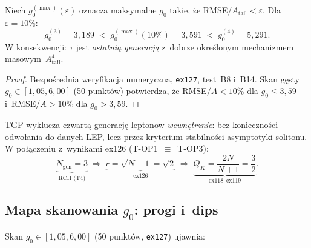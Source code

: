 \begin{theorem}%
\label{thm:T4-rch}
Niech $g_0^{(\max)}(\varepsilon)$ oznacza maksymalne $g_0$ takie, \.ze
RMSE$/A_{\mathrm{tail}} < \varepsilon$.  Dla $\varepsilon = 10\%$:
\[
  g_0^{(3)} = 3{,}189
  \;<\; g_0^{(\max)}(10\%) = 3{,}591
  \;<\; g_0^{(4)} = 5{,}291.
\]
W konsekwencji: $\tau$ jest \emph{ostatni\k{a} genera\-cj\k{a}} z~dobrze
okre\'slonym mechanizmem masowym~$A_{\mathrm{tail}}^4$.
\end{theorem}

\begin{proof}
Bezpo\'srednia weryfikacja numeryczna, \texttt{ex127}, test~B8 i~B14.
Skan g\k{e}sty $g_0 \in [1{,}05, 6{,}00]$ (50 punkt\'ow) potwierdza, \.ze
RMSE$/A < 10\%$ dla $g_0 \leq 3{,}59$ i~RMSE$/A > 10\%$ dla
$g_0 > 3{,}59$.
\end{proof}

\begin{corollary}\label{cor:T4-top3}
TGP wyklucza czwart\k{a} genera\-cj\k{e} leptonow \emph{wewn\k{e}trznie}:
bez konieczno\'sci odwo\l{}ania do danych LEP, lecz przez kryterium
stabilno\'sci asymptotyki solitonu.  W po\l{}\k{a}czeniu z~wynikami
ex126 (T-OP1~$\equiv$~T-OP3):
\begin{equation}\label{eq:T4-chain}
  \underbrace{N_{\mathrm{gen}} = 3}_{\text{RCH (T4)}}
  \;\Longrightarrow\;
  \underbrace{r = \sqrt{N-1} = \sqrt{2}}_{\text{ex126}}
  \;\Longrightarrow\;
  \underbrace{Q_K = \frac{2N}{N+1} = \frac{3}{2}}_{\text{ex118--ex119}}.
\end{equation}
\end{corollary}

\subsection{Mapa skanowania $g_0$: progi i~dips}
\label{app:T4-scan}

Skan $g_0 \in [1{,}05, 6{,}00]$ (50 punkt\'ow, \texttt{ex127}) ujawnia:


